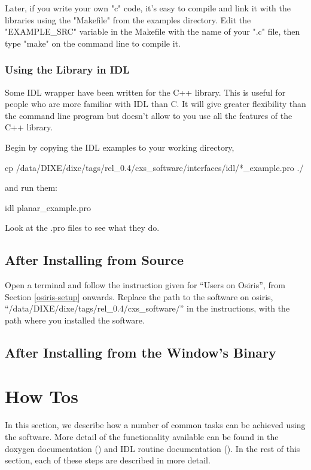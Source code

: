 \documentclass[]{cxs-software}
\begin{document}
Later, if you write your own "c" code, it's easy to compile and link
it with the libraries using the "Makefile" from the examples
directory. Edit the "EXAMPLE\_SRC" variable in the Makefile with the
name of your ".c" file, then type "make" on the command line to
compile it.

\subsubsection{Using the Library in IDL}

Some IDL wrapper have been written for the C++ library. This is useful
for people who are more familiar with IDL than C. It will give greater
flexibility than the command line program but doesn't allow to you use
all the features of the C++ library.

Begin by copying the IDL examples to your working directory, 
\begin{myverbatim}
cp /data/DIXE/dixe/tags/rel_0.4/cxs_software/interfaces/idl/*_example.pro ./ 
\end{myverbatim}
and run them: 
\begin{myverbatim}
idl planar_example.pro
\end{myverbatim}

Look at the .pro files to see what they do. 


\subsection{After Installing from Source}

Open a terminal and follow the instruction given for ``Users on
Osiris'', from Section \ref{osiris-setup} onwards. Replace the path to
the software on osiris,
``/data/DIXE/dixe/tags/rel\_0.4/cxs\_software/'' in the instructions,
with the path where you installed the software.

\subsection{After Installing from the Window's Binary}





\section{How Tos}
\label{how to}

In this section, we describe how a number of common tasks can be
achieved using the software. More detail of the functionality
available can be found in the doxygen documentation () and IDL routine
documentation (). In the rest of this section, each of these steps are
described in more detail.
\end{document}
